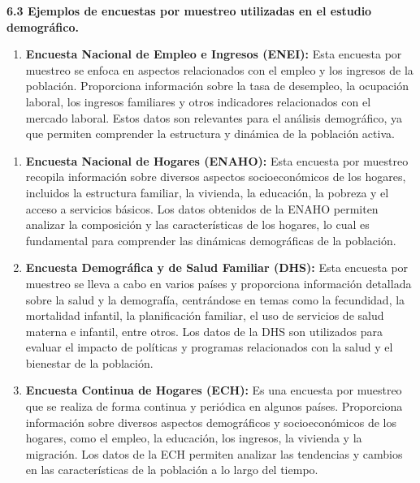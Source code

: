 \documentclass[8pt,a4paper]{beamer}
\begin{document}
{\begin{frame}{}
\begin{block}{\textbf{6.3 Ejemplos de encuestas por muestreo utilizadas en el estudio demográfico.}}
\begin{enumerate}
\item[\ding{79}] \textbf{Encuesta Nacional de Empleo e Ingresos (ENEI):} Esta encuesta por muestreo se enfoca en aspectos relacionados con el empleo y los ingresos de la población. Proporciona información sobre la tasa de desempleo, la ocupación laboral, los ingresos familiares y otros indicadores relacionados con el mercado laboral. Estos datos son relevantes para el análisis demográfico, ya que permiten comprender la estructura y dinámica de la población activa.

\end{enumerate}
\end{block}
\end{frame}

\begin{frame}{}
\begin{block}{}
\justifying
\begin{enumerate}
\justifying
\item[\ding{79}] \textbf{Encuesta Nacional de Hogares (ENAHO):} Esta encuesta por muestreo recopila información sobre diversos aspectos socioeconómicos de los hogares, incluidos la estructura familiar, la vivienda, la educación, la pobreza y el acceso a servicios básicos. Los datos obtenidos de la ENAHO permiten analizar la composición y las características de los hogares, lo cual es fundamental para comprender las dinámicas demográficas de la población.

\item[\ding{79}] \textbf{Encuesta Demográfica y de Salud Familiar (DHS):} Esta encuesta por muestreo se lleva a cabo en varios países y proporciona información detallada sobre la salud y la demografía, centrándose en temas como la fecundidad, la mortalidad infantil, la planificación familiar, el uso de servicios de salud materna e infantil, entre otros. Los datos de la DHS son utilizados para evaluar el impacto de políticas y programas relacionados con la salud y el bienestar de la población.

\item[\ding{79}] \textbf{Encuesta Continua de Hogares (ECH):} Es una encuesta por muestreo que se realiza de forma continua y periódica en algunos países. Proporciona información sobre diversos aspectos demográficos y socioeconómicos de los hogares, como el empleo, la educación, los ingresos, la vivienda y la migración. Los datos de la ECH permiten analizar las tendencias y cambios en las características de la población a lo largo del tiempo.
\end{enumerate}
\end{block}
\end{frame}

}
\end{document}
